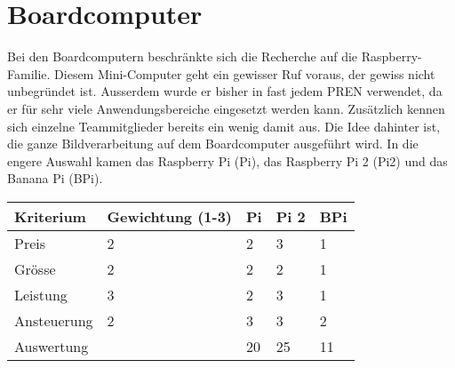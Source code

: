 \section{Boardcomputer}

Bei den Boardcomputern beschränkte sich die Recherche auf die Raspberry-Familie.
Diesem Mini-Computer geht ein gewisser Ruf voraus, der gewiss nicht unbegründet ist.
Ausserdem wurde er bisher in fast jedem PREN verwendet, da er für sehr viele Anwendungsbereiche eingesetzt werden kann.
Zusätzlich kennen sich einzelne Teammitglieder bereits ein wenig damit aus.
Die Idee dahinter ist, die ganze Bildverarbeitung auf dem Boardcomputer ausgeführt wird.
In die engere Auswahl kamen das Raspberry Pi (Pi), das Raspberry Pi 2 (Pi2) und das Banana Pi (BPi).


\begin{table}[h]
\begin{tabular}{|p{4.5cm}|p{3.5cm}|p{2cm}|p{2cm}|p{2cm}|}\hline
	
	\textbf{Kriterium}	& 	\textbf{Gewichtung (1-3)} & \textbf{Pi} & \textbf{Pi 2} & \textbf{BPi}\\\hline
	{Preis}	& 	{2} & {2} & {3} & {1}\\\hline
	{Grösse}	& 	{2} & {2} & {2} & {1}\\\hline
	{Leistung}	& 	{3} & {2} & {3} & {1}\\\hline
	{Ansteuerung}	& 	{2} & {3} & {3} & {2}\\\hline
	{Auswertung} & {} & {20} & {25} & {11}
	
	
	
	
\end{tabular}\\
\end{table}